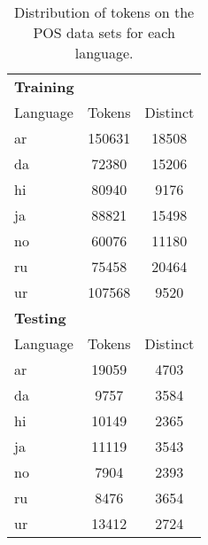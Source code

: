 \begin{table}[h!]
    \centering
    \begin{tabular}{l c c }%
        \toprule
        \multicolumn{3}{l}{\bfseries Training} \\
        Language & Tokens & Distinct \\
        
        \cmidrule(lr){1-3}

        ar   & 150631 & 18508 \\

        da   &  72380 & 15206 \\

        hi   &  80940 &  9176 \\

        ja   &  88821 & 15498 \\

        no   &  60076 & 11180 \\

        ru   &  75458 & 20464 \\

        ur   & 107568 & 9520 \\

        \cmidrule(lr){1-3}
        \multicolumn{3}{l}{\bfseries Testing} \\
        Language & Tokens & Distinct \\
        
        \cmidrule(lr){1-3}

        ar  & 19059 & 4703 \\

        da  & 9757 & 3584 \\

        hi  & 10149 & 2365 \\

        ja  &11119 & 3543 \\

        no  & 7904 & 2393 \\

        ru  & 8476 &  3654 \\

        ur  & 13412 &  2724 \\

        \bottomrule
    \end{tabular}
    \caption{Distribution of tokens on the POS data sets for each language.
    }\label{table:token-distribution-pos}
\end{table}


